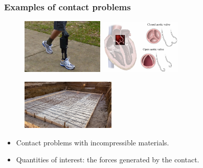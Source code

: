 \documentclass[8pt, oneside]{beamer}   	%
\newcommand{\titlecolor}[1]{\frametitle{\textcolor{dkgrey}{ \textbf{#1}}}}
\begin{document}
\begin{frame}
\titlecolor{Examples of contact problems}
\begin{figure}[htbp!]
	\includegraphics[width=0.35\textwidth]{img/walking}
		\label{abb_arc}\qquad 
			\includegraphics[width=0.35\textwidth]{img/aorticvalve}
		\label{abb_arc}
\end{figure}
\begin{figure}[htbp!]
		\centering
	\includegraphics[width=0.4\textwidth]{img/foundation}
		\label{abb_arc}
\end{figure}
\begin{itemize}
\item Contact problems with incompressible materials. 
\item Quantities of interest: the forces generated by the contact.
\end{itemize}
\end{frame}
\end{document}
